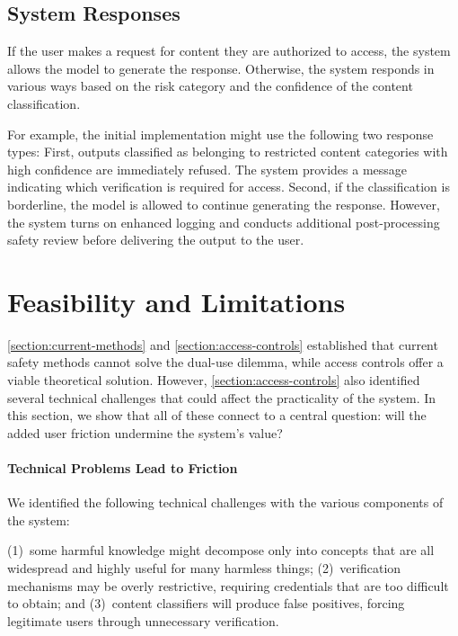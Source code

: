 \documentclass{article}
\theoremstyle{plain}
\theoremstyle{definition}
\theoremstyle{remark}
\begin{document}
\subsection{System Responses} \label{section:system-responses}

If the user makes a request for content they are authorized to access, the system allows the model to generate the response.
Otherwise, the system responds in various ways based on the risk category and the confidence of the content classification.

For example, the initial implementation might use the following two response types:
First, outputs classified as belonging to restricted content categories with high confidence are immediately refused.
The system provides a message indicating which verification is required for access.
Second, if the classification is borderline, the model is allowed to continue generating the response.
However, the system turns on enhanced logging and conducts additional post-processing safety review before delivering the output to the user.

\section{Feasibility and Limitations}
\label{section:feasibility-and-limitations}

\cref{section:current-methods} and \cref{section:access-controls} established that current safety methods cannot solve the dual-use dilemma, while access controls offer a viable theoretical solution.
However, \cref{section:access-controls} also identified several technical challenges that could affect the practicality of the system.
In this section, we show that all of these connect to a central question: will the added user friction undermine the system's value?

\paragraph{Technical Problems Lead to Friction}

We identified the following technical challenges with the various components of the system:

(1)~some harmful knowledge might decompose only into concepts that are all widespread and highly useful for many harmless things;
(2)~verification mechanisms may be overly restrictive, requiring credentials that are too difficult to obtain;
and (3)~content classifiers will produce false positives, forcing legitimate users through unnecessary verification.
\end{document}
